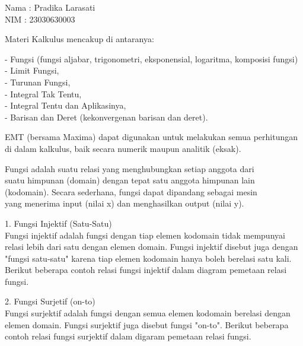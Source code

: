 \documentclass[a4paper,10pt]{article}
\begin{document}
\begin{eulernotebook}
\begin{eulercomment}
Nama : Pradika Larasati\\
NIM  : 23030630003

\begin{eulercomment}
\begin{eulercomment}
Materi Kalkulus mencakup di antaranya:

- Fungsi (fungsi aljabar, trigonometri, eksponensial, logaritma,
komposisi fungsi)\\
- Limit Fungsi,\\
- Turunan Fungsi,\\
- Integral Tak Tentu,\\
- Integral Tentu dan Aplikasinya,\\
- Barisan dan Deret (kekonvergenan barisan dan deret).

EMT (bersama Maxima) dapat digunakan untuk melakukan semua perhitungan
di dalam kalkulus, baik secara numerik maupun analitik (eksak).

\begin{eulercomment}
\begin{eulercomment}
Fungsi adalah suatu relasi yang menghubungkan setiap anggota dari\\
suatu himpunan (domain) dengan tepat satu anggota himpunan lain\\
(kodomain). Secara sederhana, fungsi dapat dipandang sebagai mesin\\
yang menerima input (nilai x) dan menghasilkan output (nilai y).

\begin{eulercomment}
\begin{eulercomment}
1. Fungsi Injektif (Satu-Satu)\\
Fungsi injektif adalah fungsi dengan tiap elemen kodomain tidak
mempunyai relasi lebih dari satu dengan elemen domain. Fungsi injektif
disebut juga dengan "fungsi satu-satu" karena tiap elemen kodomain
hanya boleh berelasi satu kali. Berikut beberapa contoh relasi fungsi
injektif dalam diagram pemetaan relasi fungsi.

2. Fungsi Surjetif (on-to)\\
Fungsi surjektif adalah fungsi dengan semua elemen kodomain berelasi
dengan elemen domain. Fungsi surjektif juga disebut fungsi "on-to".
Berikut beberapa contoh relasi fungsi surjektif dalam digaram pemetaan
relasi fungsi.


\end{eulercomment}
\end{eulercomment}
\end{eulercomment}
\end{eulercomment}
\end{eulercomment}
\end{eulercomment}
\end{eulercomment}
\end{eulernotebook}
\end{document}
